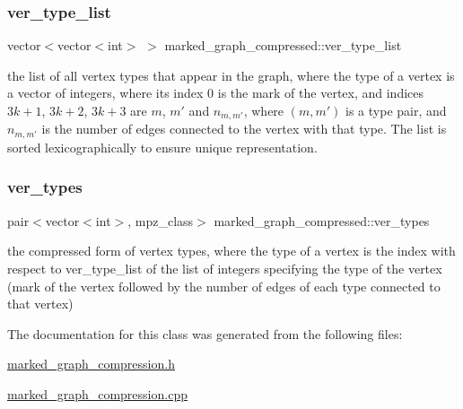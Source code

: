 \subsubsection{\texorpdfstring{ver\+\_\+type\+\_\+list}{ver\_type\_list}}
{\footnotesize\ttfamily vector$<$vector$<$int$>$ $>$ marked\+\_\+graph\+\_\+compressed\+::ver\+\_\+type\+\_\+list}



the list of all vertex types that appear in the graph, where the type of a vertex is a vector of integers, where its index 0 is the mark of the vertex, and indices $3k+1$, $3k+2$, $3k+3$ are $m$, $m'$ and $n_{m,m'}$, where $(m,m')$ is a type pair, and $n_{m,m'}$ is the number of edges connected to the vertex with that type. The list is sorted lexicographically to ensure unique representation. 

\mbox{\label{classmarked__graph__compressed_af446cc5e23c241a92b76642fd5ebc403}} 
\subsubsection{\texorpdfstring{ver\+\_\+types}{ver\_types}}
{\footnotesize\ttfamily pair$<$vector$<$int$>$, mpz\+\_\+class$>$ marked\+\_\+graph\+\_\+compressed\+::ver\+\_\+types}



the compressed form of vertex types, where the type of a vertex is the index with respect to ver\+\_\+type\+\_\+list of the list of integers specifying the type of the vertex (mark of the vertex followed by the number of edges of each type connected to that vertex) 



The documentation for this class was generated from the following files\+:\begin{DoxyCompactItemize}
\item 
\hyperlink{marked__graph__compression_8h}{marked\+\_\+graph\+\_\+compression.\+h}\item 
\hyperlink{marked__graph__compression_8cpp}{marked\+\_\+graph\+\_\+compression.\+cpp}\end{DoxyCompactItemize}
